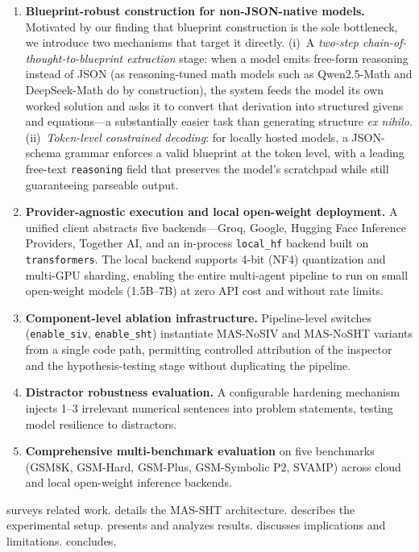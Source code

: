 \documentclass[11pt,a4paper]{article}
\begin{document}
\begin{enumerate}[leftmargin=*,itemsep=3pt]
    \item \textbf{Blueprint-robust construction for non-JSON-native models.} Motivated by our finding that blueprint construction is the sole bottleneck, we introduce two mechanisms that target it directly. (i)~A \emph{two-step chain-of-thought-to-blueprint extraction} stage: when a model emits free-form reasoning instead of JSON (as reasoning-tuned math models such as Qwen2.5-Math and DeepSeek-Math do by construction), the system feeds the model its own worked solution and asks it to convert that derivation into structured givens and equations---a substantially easier task than generating structure \emph{ex nihilo}. (ii)~\emph{Token-level constrained decoding}: for locally hosted models, a JSON-schema grammar enforces a valid blueprint at the token level, with a leading free-text \texttt{reasoning} field that preserves the model's scratchpad while still guaranteeing parseable output.
    \item \textbf{Provider-agnostic execution and local open-weight deployment.} A unified client abstracts five backends---Groq, Google, Hugging Face Inference Providers, Together AI, and an in-process \texttt{local\_hf} backend built on \texttt{transformers}. The local backend supports 4-bit (NF4) quantization and multi-GPU sharding, enabling the entire multi-agent pipeline to run on small open-weight models (1.5B--7B) at zero API cost and without rate limits.
    \item \textbf{Component-level ablation infrastructure.} Pipeline-level switches (\texttt{enable\_siv}, \texttt{enable\_sht}) instantiate MAS-NoSIV and MAS-NoSHT variants from a single code path, permitting controlled attribution of the inspector and the hypothesis-testing stage without duplicating the pipeline.
    \item \textbf{Distractor robustness evaluation.} A configurable hardening mechanism injects 1--3 irrelevant numerical sentences into problem statements, testing model resilience to distractors.
    \item \textbf{Comprehensive multi-benchmark evaluation} on five benchmarks (GSM8K, GSM-Hard, GSM-Plus, GSM-Symbolic P2, SVAMP) across cloud and local open-weight inference backends.
\end{enumerate}
 surveys related work.
 details the MAS-SHT architecture.
 describes the experimental setup.
 presents and analyzes results.
 discusses implications and limitations.
 concludes.
\end{document}
